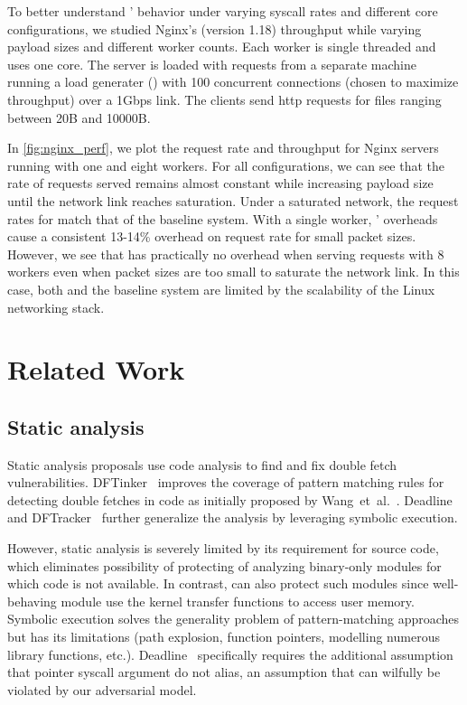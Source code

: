 \documentclass[letterpaper,twocolumn,10pt]{article}
\begin{document}
To better understand \midas' behavior under varying syscall 
rates and different core configurations, we studied Nginx's (version 1.18) 
throughput while varying payload sizes and different worker counts.
Each worker is single threaded and uses one core.
The server is loaded with requests from a separate machine running 
a load generater () with 100 concurrent 
connections (chosen to maximize throughput) over a 1Gbps link.
The clients send http requests for files ranging between 20B and
10000B.

In \autoref{fig:nginx_perf}, we plot the request rate and throughput
for Nginx servers running with one and eight workers.
For all configurations, we can see that the rate of requests served 
remains almost constant while increasing payload size until the network 
link reaches saturation.
Under a saturated network, the request rates for \midas match that 
of the baseline system.
With a single worker, \midas' overheads cause a consistent 13-14\% 
overhead on request rate for small packet sizes.
However, we see that \midas has practically no overhead when serving 
requests with 8 workers even when packet sizes are too small to 
saturate the network link.
In this case, both \midas and the baseline system are limited by the
scalability of the Linux networking stack.

\section{Related Work}

\subsection{Static analysis}

Static analysis proposals use code analysis to find and fix double fetch
vulnerabilities.
DFTinker~\cite{dftinker} improves the coverage of pattern matching rules 
for detecting double fetches in code as initially proposed by Wang~et~al.~\cite{wang2017double}.
Deadline~\cite{deadline} and DFTracker~\cite{wang2019dftracker} further 
generalize the analysis by leveraging symbolic execution.

However, static analysis is severely limited by its requirement for
source code, which eliminates possibility of protecting of analyzing 
binary-only modules for which code is not available. 
In contrast, \midas can also protect such modules since well-behaving
module use the kernel transfer functions to access user memory.
Symbolic execution solves the generality problem of pattern-matching 
approaches but has its limitations (path explosion, function pointers, 
modelling numerous library functions, etc.).
Deadline~\cite{deadline} specifically requires the additional assumption
that pointer syscall argument do not alias, an assumption that can 
wilfully be violated by our adversarial model.
\end{document}
